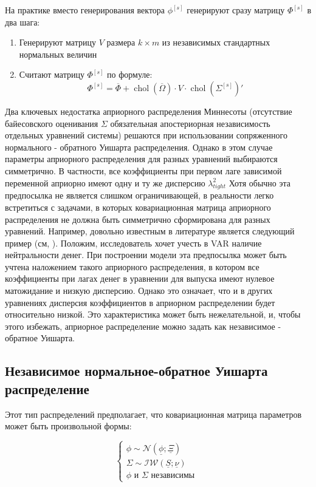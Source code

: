 \documentclass[11pt]{article} %
\DeclareMathOperator{\chol}{chol}
\newcommand{\cN}{\mathcal{N}}
\newcommand{\cIW}{\mathcal{IW}}
\newcommand{\prior}{\underline}
\newcommand{\post}{\overline}
\begin{document}
На практике вместо генерирования вектора $\phi^{[s]}$ генерируют сразу матрицу $\Phi^{[s]}$ в два шага:

\begin{enumerate}
\item Генерируют матрицу $V$ размера $k\times m$  из независимых стандартных нормальных величин
\item Считают матрицу $\Phi^{[s]}$ по формуле:
\[
\Phi^{[s]} = \post \Phi + \chol(\post\Omega) \cdot V \cdot \chol(\Sigma^{[s]})'
\]
\end{enumerate}

Два ключевых недостатка априорного распределения Миннесоты (отсутствие байесовского оценивания $\Sigma$ обязательная апостериорная независимость отдельных уравнений системы) решаются при использовании сопряженного нормального  - обратного Уишарта распределения. Однако в этом случае параметры априорного распределения для разных уравнений выбираются симметрично. В частности, все коэффициенты при первом лаге зависимой переменной априорно имеют одну и ту же дисперсию $\lambda_{tight}^2$  Хотя обычно эта предпосылка не является слишком ограничивающей, в реальности легко встретиться с задачами, в которых ковариационная матрица априорного распределения не должна быть симметрично сформирована для разных уравнений. Например, довольно известным в литературе является следующий пример (см, \cite{kadiyala_karlsson_1997_numerical}). Положим, исследователь хочет  учесть в VAR наличие нейтральности денег. При построении модели эта предпосылка может быть учтена наложением такого априорного распределения, в котором все коэффициенты при лагах денег в уравнении для выпуска имеют нулевое матожидание и низкую дисперсию. Однако это означает, что и в других уравнениях дисперсия коэффициентов в априорном распределении будет относительно низкой. Это характеристика может быть нежелательной, и, чтобы этого избежать,   априорное распределение можно задать как независимое - обратное Уишарта. 

\subsection{Независимое нормальное-обратное Уишарта распределение}

Этот тип распределений предполагает, что ковариационная матрица параметров может быть произвольной формы: 

\begin{equation}
\begin{cases}
\phi \sim \cN(\prior\phi; \prior\Xi ) \\
\Sigma \sim \cIW(\prior S; \prior\nu) \\
\phi \text{ и } \Sigma \text{ независимы }
\end{cases}
\end{equation}
\end{document}
